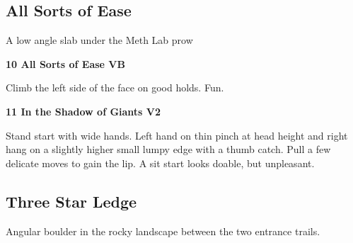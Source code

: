 \begin{multicols*}{2}
			\subsection*{All Sorts of Ease}\label{bf:All Sorts of Ease}
			\begin{minipage}{\columnwidth}
			A low angle slab under the Meth Lab prow
			\end{minipage}
			

					\label{rt:All Sorts of Ease}\colorbox{green!20}{\textbf{10 All Sorts of Ease VB \ding{72}   }}
					\begin{adjustwidth}{0.5cm}{}
					\begin{minipage}{\linewidth}					
					Climb the left side of the face on good holds. Fun.
					\end{minipage}
					\end{adjustwidth}
					\label{rt:In the Shadow of Giants}\colorbox{green!20}{\textbf{11 In the Shadow of Giants V2   }}
					\begin{adjustwidth}{0.5cm}{}
					\begin{minipage}{\linewidth}					
					Stand start with wide hands. Left hand on thin pinch at head height and right hang on a slightly higher small lumpy edge with a thumb catch. Pull a few delicate moves to gain the lip. A sit start looks doable, but unpleasant.
					\end{minipage}
					\end{adjustwidth}
			\subsection*{Three Star Ledge}\label{bf:Three Star Ledge}
			\begin{minipage}{\columnwidth}
			Angular boulder in the rocky landscape between the two entrance trails.
			\end{minipage}
			


\end{multicols*}
